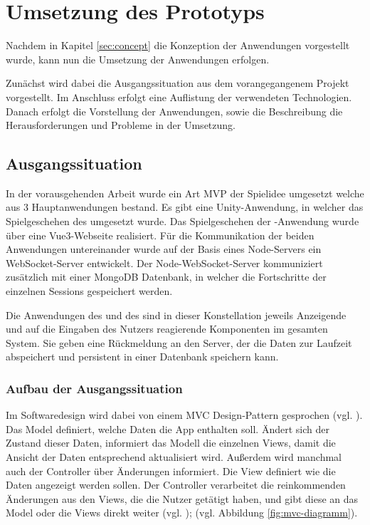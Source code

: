 \chapter{Umsetzung des Prototyps}\label{sec:realisation}
Nachdem in Kapitel \ref{sec:concept} die Konzeption der Anwendungen vorgestellt wurde, kann nun die Umsetzung der Anwendungen erfolgen.

Zunächst wird dabei die Ausgangssituation aus dem vorangegangenem Projekt vorgestellt. Im Anschluss erfolgt eine Auflistung der verwendeten Technologien. Danach erfolgt die Vorstellung der Anwendungen, sowie die Beschreibung die Herausforderungen und Probleme in der Umsetzung.

\section{Ausgangssituation}

In der vorausgehenden Arbeit wurde ein Art \ac{MVP} der Spielidee umgesetzt welche aus 3 Hauptanwendungen bestand. Es gibt eine Unity-Anwendung, in welcher das Spielgeschehen des  umgesetzt wurde. Das Spielgeschehen der -Anwendung wurde über eine Vue3-Webseite realisiert. Für die Kommunikation der beiden Anwendungen untereinander wurde auf der Basis eines  Node-Servers ein WebSocket-Server entwickelt. Der Node-WebSocket-Server kommuniziert zusätzlich mit einer MongoDB Datenbank, in welcher die Fortschritte der einzelnen Sessions gespeichert werden.

Die Anwendungen des  und des  sind in dieser Konstellation jeweils Anzeigende und auf die Eingaben des Nutzers reagierende Komponenten im gesamten System. Sie geben eine Rückmeldung an den Server, der die Daten zur Laufzeit abspeichert und persistent in einer Datenbank speichern kann.

\subsection{Aufbau der Ausgangssituation}

Im Softwaredesign wird dabei von einem \ac{MVC} Design-Pattern gesprochen (vgl. \cite{GlossarWiki:Reenskaug:1979a}). 
Das Model definiert, welche Daten die App enthalten soll. Ändert sich der Zustand dieser Daten, informiert das Modell die einzelnen Views, damit die Ansicht der Daten entsprechend aktualisiert wird. Außerdem wird manchmal auch der Controller über Änderungen informiert. Die View definiert wie die Daten angezeigt werden sollen. Der Controller verarbeitet die reinkommenden Änderungen aus den Views, die die Nutzer getätigt haben, und gibt diese an das Model oder die Views direkt weiter (vgl. \cite{noauthor_mvc_2023}); (vgl. Abbildung \ref{fig:mvc-diagramm}).

